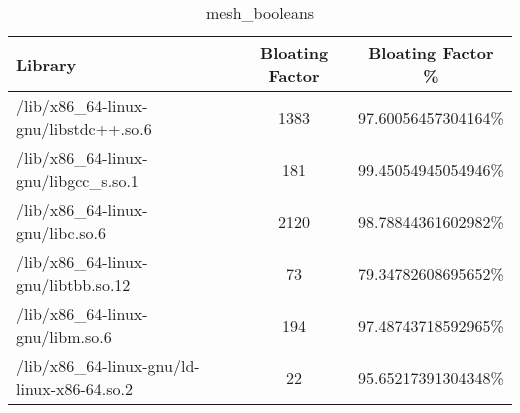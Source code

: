 \begin{table}[h]

\centering
\caption{mesh\_booleans}
\footnotesize
\begin{tabular}{l|c|c}
\toprule
Library & Bloating Factor & Bloating Factor \% \\ \midrule
\colorbox{gray!20}{/lib/x86\_64-linux-gnu/libstdc++.so.6} & 1383 & 97.60056457304164\% \\ \hline
\colorbox{gray!20}{/lib/x86\_64-linux-gnu/libgcc\_s.so.1} & 181 & 99.45054945054946\% \\ \hline
\colorbox{gray!20}{/lib/x86\_64-linux-gnu/libc.so.6} & 2120 & 98.78844361602982\% \\ \hline
\colorbox{gray!20}{/lib/x86\_64-linux-gnu/libtbb.so.12} & 73 & 79.34782608695652\% \\ \hline
\colorbox{gray!20}{/lib/x86\_64-linux-gnu/libm.so.6} & 194 & 97.48743718592965\% \\ \hline
/lib/x86\_64-linux-gnu/ld-linux-x86-64.so.2 & 22 & 95.65217391304348\% \\ \hline
\bottomrule
\end{tabular}
\end{table}


